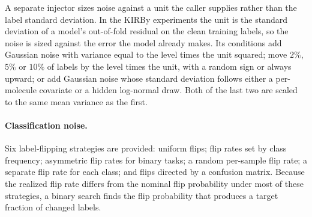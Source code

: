 A separate injector sizes noise against a unit the caller supplies rather than the label standard
deviation. In the KIRBy experiments the unit is the standard deviation of a model's out-of-fold residual on
the clean training labels, so the noise is sized against the error the model already makes. Its
conditions add Gaussian noise with variance equal to the level times the unit squared; move $2\%$,
$5\%$ or $10\%$ of labels by the level times the unit, with a random sign or always upward; or add
Gaussian noise whose standard deviation follows either a per-molecule covariate or a hidden
log-normal draw. Both of the last two are scaled to the same mean variance as the first.

\paragraph{Classification noise.} Six label-flipping strategies are provided: uniform flips; flip
rates set by class frequency; asymmetric flip rates for binary tasks; a random per-sample flip rate;
a separate flip rate for each class; and flips directed by a confusion matrix. Because the realized
flip rate differs from the nominal flip probability under most of these strategies, a binary search
finds the flip probability that produces a target fraction of changed labels.

